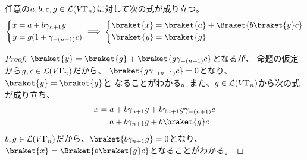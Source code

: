 {	\begin{observation}[文脈自由文法の線形化その一]
	\label{obs:文脈自由文法の線形化その一} %
		任意の$a,b,c,g\in\mathcal{L}(V\Gamma_n)$に対して次の式が成り立つ。
		\begin{equation*}\begin{split}
			\left\{\begin{split}
				x &= a + b\gamma_{n+1}y \\
				y &= g(1 + \gamma_{-(n+1)}c) \\
			\end{split}\right.\implies \left\{\begin{split}
				\braket{x} &= \braket{a} + \Braket{b\braket{y}c} \\
				\braket{y} &= \braket{g} \\
			\end{split}\right.
		\end{split}\end{equation*}
	\end{observation} %
	\begin{proof} %
		$\braket{y}=\braket{g}+\braket{g\gamma_{-(n+1)}c}$となるが、
		命題の仮定から$g,c\in\mathcal{L}(V\Gamma_n)$だから、
		$\braket{g\gamma_{-(n+1)}c}=0$となり、$\braket{y}=\braket{g}$と
		なることがわかる。また、$g\in\mathcal{L}(V\Gamma_n)$から次の式が成り立ち、
		\begin{equation*}\begin{split}
			x &= a + b\gamma_{n+1}g + b\gamma_{n+1}g\gamma_{-(n+1)}c \\
			&= a + b\gamma_{n+1}g + b\braket{g}c \\
		\end{split}\end{equation*}
		$b,g\in\mathcal{L}(V\Gamma_n)$だから、$\braket{b\gamma_{n+1}g}=0$となり、
		$\braket{x}=\Braket{b\braket{g}c}$となることがわかる。
	\end{proof} %

}
